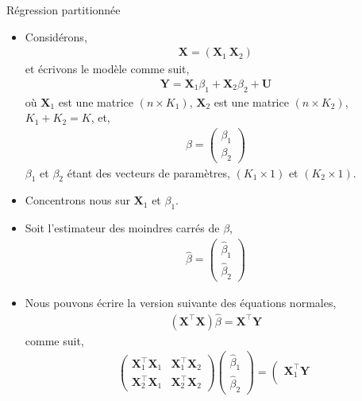 \begin{frame}[allowframebreaks]{Régression partitionnée}
\begin{itemize}
\item Considérons,
\begin{align*}
\mathbf{X} = \left(\mathbf{X}_1 \  \mathbf{X}_2\right)
\end{align*}
et écrivons le modèle comme suit,
\begin{align*}
\mathbf{Y} = \mathbf{X}_1\beta_1 + \mathbf{X}_2\beta_2 + \mathbf{U}
\end{align*}
où $\mathbf{X}_1$ est une matrice $(n\times K_1)$, $\mathbf{X}_2$ est une matrice $(n\times K_2)$, $K_1+K_2 = K$, et,
\begin{align*}
\beta = \left(
\begin{array}{c}
\beta_1\\
\beta_2
\end{array}
\right)
\end{align*}
$\beta_1$ et $\beta_2$ étant des vecteurs de paramètres, $(K_1\times 1)$ et $(K_2\times 1)$. 
\item Concentrons nous sur  $\mathbf{X}_1$ et $\beta_1$.
 \item Soit l'estimateur des moindres carrés de $\beta$,
\begin{align*}
\widehat{\beta} = \left(
\begin{array}{c}
\widehat{\beta}_1\\
\widehat{\beta}_2
\end{array}
\right)
\end{align*}
\item Nous pouvons écrire la version suivante des équations normales,
\begin{align*}
\left(\mathbf{X}^\top\mathbf{X}\right)\widehat{\beta}=\mathbf{X}^\top\mathbf{Y}
\end{align*}
comme suit,
\begin{align*}
\left(
\begin{array}{cc}
\mathbf{X}_1^\top\mathbf{X}_1&\mathbf{X}_1^\top\mathbf{X}_2\\
\mathbf{X}_2^\top\mathbf{X}_1&\mathbf{X}_2^\top\mathbf{X}_2
\end{array}
\right)
\left(
\begin{array}{c}
\widehat{\beta}_1\\
\widehat{\beta}_2
\end{array}
\right)
=
\left(
\begin{array}{c}
\mathbf{X}_1^\top\mathbf{Y}\\

\end{array}
\end{align*}
\end{itemize}
\end{frame}
